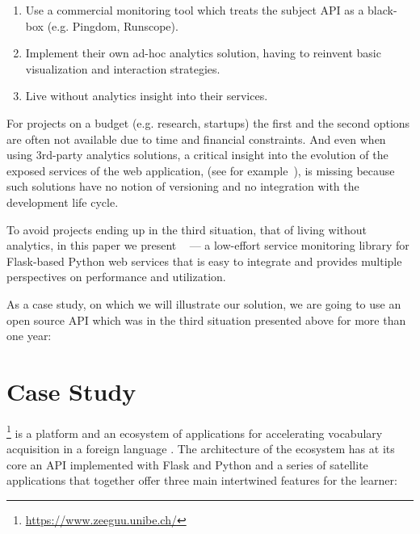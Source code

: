 \documentclass[conference]{IEEEtran}
\begin{document}
  \begin{enumerate}

    \item Use a commercial monitoring tool which treats the subject API as a black-box (e.g. Pingdom, Runscope). 

    \item Implement their own ad-hoc analytics solution, having to reinvent basic visualization and interaction strategies. 

    \item Live without analytics insight into their services.

  \end{enumerate}


For projects on a budget (e.g. research, startups) the first and the second options are often not available due to time and financial constraints. And even when using 3rd-party analytics solutions, a critical insight into the evolution of the exposed services of the web application, (see for example~\cite{papazoglou2011managing}), is missing because such solutions have no notion of versioning and no integration with the development life cycle.

To avoid projects ending up in the third situation, that of living without analytics, in this paper we present \tool~ --- a low-effort service monitoring library for Flask-based Python web services that is easy to integrate and provides multiple perspectives on performance and utilization.

As a case study, on which we will illustrate our solution, we are going to use an open source API which was in the third situation presented above for more than one year:



\section{Case Study}


  \zee\footnote{\url{https://www.zeeguu.unibe.ch/}} is a platform and an ecosystem of applications for accelerating vocabulary acquisition in a foreign language \cite{Lungu16}. 
%
  The architecture of the ecosystem has at its core an API implemented with Flask and Python and a series of satellite applications that together offer three main intertwined features for the learner:
\end{document}
